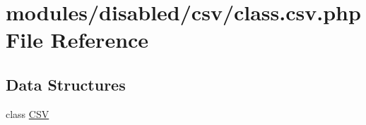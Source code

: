 \hypertarget{class_8csv_8php}{\section{modules/disabled/csv/class.csv.\-php File Reference}
\label{class_8csv_8php}
}
\subsection*{Data Structures}
\begin{DoxyCompactItemize}
\item 
class \hyperlink{class_c_s_v}{C\-S\-V}
\end{DoxyCompactItemize}
